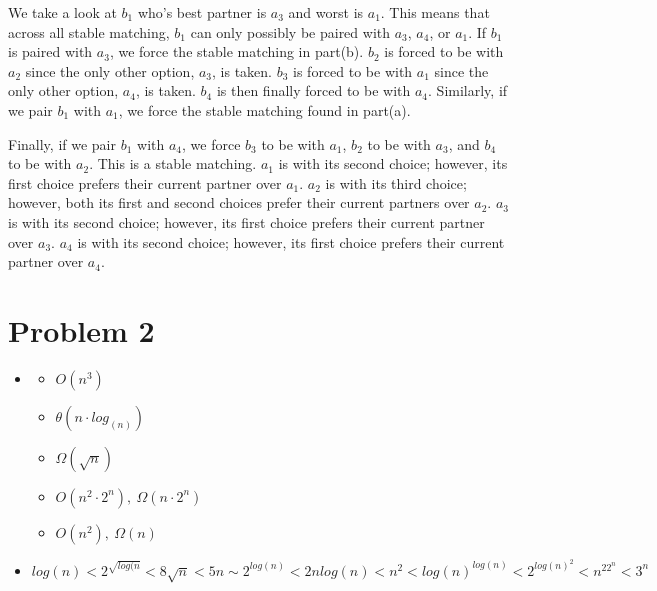 \documentclass[12pt]{article}
\begin{document}
\begin{itemize}
We take a look at $b_1$ who's best partner is $a_3$ and worst is $a_1$. This means that across all stable matching, $b_1$ can only possibly be paired with $a_3$, $a_4$, or $a_1$. If $b_1$ is paired with $a_3$, we force the stable matching in part(b). $b_2$ is forced to be with $a_2$ since the only other option, $a_3$, is taken. $b_3$ is forced to be with $a_1$ since the only other option, $a_4$, is taken. $b_4$ is then finally forced to be with $a_4$. Similarly, if we pair $b_1$ with $a_1$, we force the stable matching found in part(a).

Finally, if we pair $b_1$ with $a_4$, we force $b_3$ to be with $a_1$, $b_2$ to be with $a_3$, and $b_4$ to be with $a_2$. This is a stable matching. $a_1$ is with its second choice; however, its first choice prefers their current partner over $a_1$. $a_2$ is with its third choice; however, both its first and second choices prefer their current partners over $a_2$. $a_3$ is with its second choice; however, its first choice prefers their current partner over $a_3$. $a_4$ is with its second choice; however, its first choice prefers their current partner over $a_4$.
\end{itemize}



\section*{Problem 2}

\begin{itemize}
\item[a)]
    \begin{itemize}
    \item[]  $O(n^3)$
    \item[] $\theta(n\cdot log_(n))$
    \item[] $\Omega(\sqrt{n})$
    \item[] $O(n^2 \cdot 2^n), ~\Omega(n\cdot2^n)$
    \item[] $O(n^2), ~\Omega(n)$
    \end{itemize}
\item[b)]
\[log(n) < 2^{\sqrt{log(n}} < 8\sqrt{n} < 5n \sim 2^{log(n)} < 2nlog(n) < n^2 < log(n)^{log(n)} < 2^{log(n)^2} < n^22^n < 3^n\]
\end{itemize}
\end{document}
